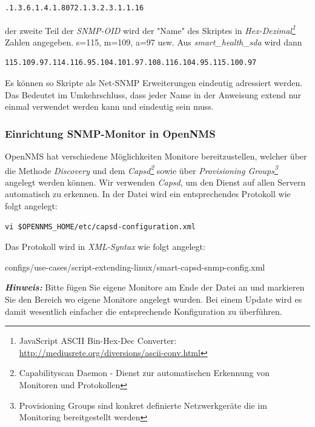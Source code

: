 \begin{lstlisting}[numbers=none]
.1.3.6.1.4.1.8072.1.3.2.3.1.1.16
\end{lstlisting}

der zweite Teil der \emph{SNMP-OID} wird der "Name" des Skriptes in \emph{Hex-Dezimal\footnote{JavaScript ASCII Bin-Hex-Dec Converter: \url{http://mediusrete.org/diversions/ascii-conv.html}}} Zahlen angegeben. s=115, m=109, a=97 usw. Aus \emph{smart\_health\_sda} wird dann 

\begin{lstlisting}[numbers=none]
115.109.97.114.116.95.104.101.97.108.116.104.95.115.100.97
\end{lstlisting}

Es können so Skripte als Net-SNMP Erweiterungen eindeutig adressiert werden. Das Bedeutet im Umkehrschluss, dass jeder Name in der Anweisung extend nur einmal verwendet werden kann und eindeutig sein muss.

\subsubsection{Einrichtung SNMP-Monitor in OpenNMS}
OpenNMS hat verschiedene Möglichkeiten Monitore bereitzustellen, welcher über die Methode \emph{Discovery} und dem \emph{Capsd\footnote{Capabilityscan Daemon - Dienst zur automatischen Erkennung von Monitoren und Protokollen}} sowie über \emph{Provisioning Groups\footnote{Provisioning Groups sind konkret definierte Netzwerkgeräte die im Monitoring bereitgestellt werden}} angelegt werden können. Wir verwenden \emph{Capsd}, um den Dienst auf allen Servern automatisch zu erkennen. In der Datei wird ein entsprechendes Protokoll wie folgt angelegt:

\begin{lstlisting}[numbers=none]
vi $OPENNMS_HOME/etc/capsd-configuration.xml
\end{lstlisting}

Das Protokoll wird in \emph{XML-Syntax} wie folgt angelegt:


  {configs/use-cases/script-extending-linux/smart-capsd-snmp-config.xml}

\textbf{\textit{Hinweis:}} Bitte fügen Sie eigene Monitore am Ende der Datei an und markieren Sie den Bereich wo eigene Monitore angelegt wurden. Bei einem Update wird es damit wesentlich einfacher die entsprechende Konfiguration zu überführen.

